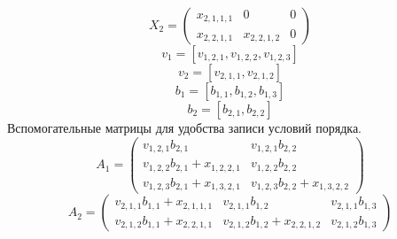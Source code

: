 \documentclass[a4paper,article,14pt]{extarticle}
\begin{document}
\begin{equation}
X_{2} = 
\begin{pmatrix}
    x_{2,1,1,1} & 0 & 0\\
    x_{2,2,1,1} & x_{2,2,1,2} & 0 
\end{pmatrix}
\end{equation}
\begin{equation}
    v_{1} = \left[
    v_{1,2,1}, v_{1,2,2}, v_{1,2,3}
    \right]
\end{equation}
\begin{equation}
    v_{2} = \left[
    v_{2,1,1}, v_{2,1,2}
    \right]
\end{equation}
\begin{equation}
    b_{1} = \left[
    b_{1,1}, b_{1,2}, b_{1,3}
    \right]
\end{equation}
\begin{equation}
    b_{2} = \left[
    b_{2,1}, b_{2,2}
    \right]
\end{equation}
Вспомогательные матрицы для удобства записи условий порядка.
\begin{equation}
A_{1} = 
\begin{pmatrix}
    v_{1,2,1} b_{2,1} & v_{1,2,1} b_{2,2} \\
    v_{1,2,2} b_{2,1} + x_{1,2,2,1} & v_{1,2,2} b_{2,2} \\
    v_{1,2,3} b_{2,1} + x_{1,3,2,1} & v_{1,2,3} b_{2,2} + x_{1,3,2,2}
\end{pmatrix}
\end{equation}
\begin{equation}
A_{2} = 
\begin{pmatrix}
    v_{2,1,1} b_{1,1} + x_{2,1,1,1} & v_{2,1,1} b_{1,2} & v_{2,1,1} b_{1,3}\\
    v_{2,1,2} b_{1,1} + x_{2,2,1,1} & v_{2,1,2} b_{1,2} + x_{2,2,1,2} & v_{2,1,2} b_{1,3}
\end{pmatrix}
\end{equation}
\end{document}
